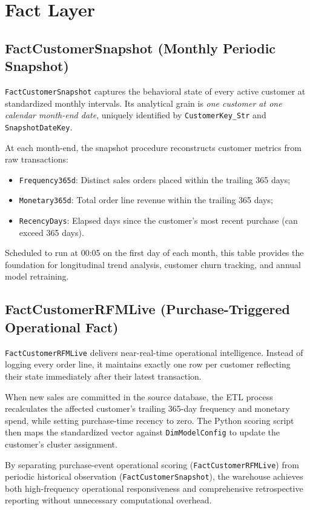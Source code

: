 \section{Fact Layer}
\subsection{FactCustomerSnapshot (Monthly Periodic Snapshot)}
\texttt{FactCustomerSnapshot} captures the behavioral state of every active customer at standardized monthly intervals. Its analytical grain is \emph{one customer at one calendar month-end date}, uniquely identified by \texttt{CustomerKey\_Str} and \texttt{SnapshotDateKey}.

At each month-end, the snapshot procedure reconstructs customer metrics from raw transactions:
\begin{itemize}
    \item \texttt{Frequency365d}: Distinct sales orders placed within the trailing 365 days;
    \item \texttt{Monetary365d}: Total order line revenue within the trailing 365 days;
    \item \texttt{RecencyDays}: Elapsed days since the customer's most recent purchase (can exceed 365 days).
\end{itemize}
Scheduled to run at 00:05 on the first day of each month, this table provides the foundation for longitudinal trend analysis, customer churn tracking, and annual model retraining.

\subsection{FactCustomerRFMLive (Purchase-Triggered Operational Fact)}
\label{subsec:factcustomerRFMlive}
\texttt{FactCustomerRFMLive} delivers near-real-time operational intelligence. Instead of logging every order line, it maintains exactly one row per customer reflecting their state immediately after their latest transaction.

When new sales are committed in the source database, the ETL process recalculates the affected customer's trailing 365-day frequency and monetary spend, while setting purchase-time recency to zero. The Python scoring script then maps the standardized vector against \texttt{DimModelConfig} to update the customer's cluster assignment. 

By separating purchase-event operational scoring (\texttt{FactCustomerRFMLive}) from periodic historical observation (\texttt{FactCustomerSnapshot}), the warehouse achieves both high-frequency operational responsiveness and comprehensive retrospective reporting without unnecessary computational overhead.
